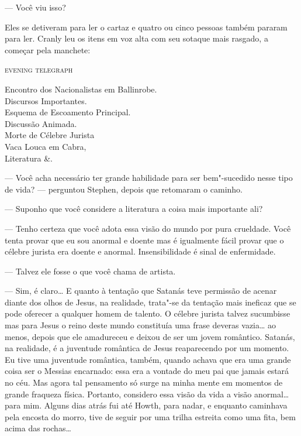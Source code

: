 --- Você viu isso?

Eles se detiveram para ler o cartaz e quatro ou
cinco pessoas também pararam para ler.  Cranly leu os itens em voz alta
com seu sotaque mais rasgado, a começar pela manchete:

\bigskip

{\centering
\textsc{evening telegraph}		
\par}

{\centering
Encontro dos Nacionalistas em Ballinrobe.\\
Discursos Importantes.\\
Esquema de Escoamento Principal.\\
Discussão Animada.\\
Morte de Célebre Jurista\\
Vaca Louca em Cabra,\\
Literatura \&.
\par}

\bigskip

--- Você acha necessário ter grande habilidade para ser
bem"-sucedido nesse tipo de vida? --- perguntou Stephen, depois que
retomaram o caminho.

--- Suponho que você considere a literatura a coisa mais
importante ali?

--- Tenho certeza que você adota essa visão do mundo por pura
crueldade.  Você tenta provar que eu sou anormal e doente mas é
igualmente fácil provar que o célebre jurista era doente e anormal. 
Insensibilidade é sinal de enfermidade.

--- Talvez ele fosse \label{o"-que} o que você chama de artista.

--- Sim, é claro\ldots{}  E quanto à tentação que Satanás teve
permissão de acenar diante dos olhos de Jesus, na realidade, trata"-se
da tentação mais ineficaz que se pode oferecer a qualquer homem de
talento.  O célebre jurista talvez sucumbisse mas para Jesus o reino
deste mundo constituía uma frase deveras vazia\ldots{} ao menos, depois que
ele amadureceu e deixou de ser um jovem romântico.  \label{satanas"-na} Satanás, na
realidade, é a juventude romântica de Jesus reaparecendo por um
momento.  Eu tive uma juventude romântica, também, quando achava que
era uma grande coisa ser o Messias encarnado: essa era a vontade do meu
pai que jamais estará no céu.  Mas agora tal pensamento só surge na
minha mente em momentos de grande fraqueza física.  Portanto, considero
essa visão da vida a visão anormal\ldots{} para mim.  Alguns dias atrás fui
até Howth, para nadar, e enquanto caminhava pela encosta do morro, tive
de seguir por uma trilha estreita como uma fita, bem acima das
rochas\ldots{}

